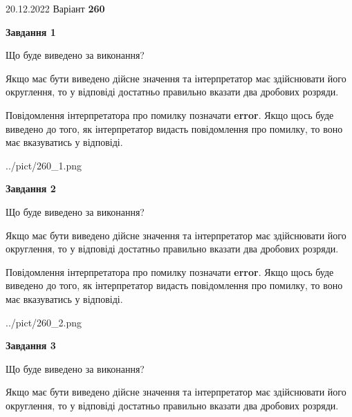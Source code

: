 \documentclass[12pt, ukrainian]{article}
\begin{document}
{20.12.2022 Варіант \No \textbf { 260 }\par}
{
\begin {Large}

{\begin {center}\textbf{Завдання 1}\end {center}}\par
Що буде виведено за виконання? \par

Якщо має бути виведено дійсне значення та інтерпретатор має здійснювати його округлення, 
то у відповіді достатньо правильно вказати два дробових розряди.

Повідомлення інтерпретатора про помилку позначати \textbf{error}.
Якщо щось буде виведено до того, як інтерпретатор видасть повідомлення про помилку, 
то воно має вказуватись у відповіді. \par

\begin{center}
	{../pict/260_1.png}
\end{center}
\newpage

{\begin {center}\textbf{Завдання 2}\end {center}}\par
Що буде виведено за виконання? \par

Якщо має бути виведено дійсне значення та інтерпретатор має здійснювати його округлення, 
то у відповіді достатньо правильно вказати два дробових розряди.

Повідомлення інтерпретатора про помилку позначати \textbf{error}.
Якщо щось буде виведено до того, як інтерпретатор видасть повідомлення про помилку, 
то воно має вказуватись у відповіді. \par

\begin{center}
	{../pict/260_2.png}
\end{center}
\newpage

{\begin {center}\textbf{Завдання 3}\end {center}}\par
Що буде виведено за виконання? \par

Якщо має бути виведено дійсне значення та інтерпретатор має здійснювати його округлення, 
то у відповіді достатньо правильно вказати два дробових розряди.


\end{Large}}
\end{document}
